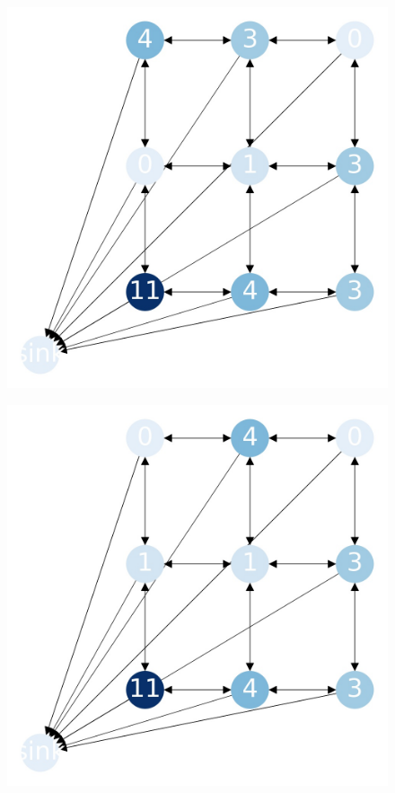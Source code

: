 \documentclass{beamer}
\begin{document}
    \begin{frame}
      \begin{figure}[h!]
        \centering
          \includegraphics[scale=0.25]{sandpile_-22}
      \end{figure}
    \end{frame}
    

    \begin{frame}
      \begin{figure}[h!]
        \centering
          \includegraphics[scale=0.25]{sandpile_-23}
      \end{figure}
    \end{frame}
    
\end{document}
